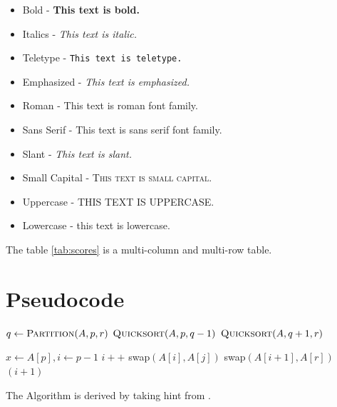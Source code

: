 \documentclass{article}
\begin{document}
\begin{itemize} %
    \item Bold - \textbf{This text is bold.}
    \item Italics - \textit{This text is italic.}
    \item Teletype - \texttt{This text is teletype.}
    \item Emphasized - \emph{This text is emphasized.}
    \item Roman - \textrm{This text is roman font family.}
    \item Sans Serif - \textsf{This text is sans serif font family.}
    \item Slant - \textsl{This text is slant.}
    \item Small Capital - \textsc{This text is small capital.}
    \item Uppercase - \uppercase{This text is uppercase.}
    \item Lowercase - \lowercase{This text is lowercase.}
\end{itemize}

The table \ref{tab:scores} is a multi-column and multi-row table.

\newpage
\pagecolor{white}
\section{Pseudocode} %

\begin{algorithmic}

\State $q \leftarrow \Call{Partition}{A, p, r}$
\State $\Call{Quicksort}{A, p, q-1}$
\State $\Call{Quicksort}{A, q+1, r}$
\EndIf
\EndFunction

\State $x \gets A[p] , i \gets p-1 $
\State $i++$
\State swap$(A[i],A[j])$
\EndIf
\EndFor
\State swap$(A[i+1],A[r])$
\State \Return $(i+1)$
\EndFunction
\end{algorithmic}
The Algorithm is derived by taking hint from \cite{hoare1962quicksort}.

\newpage
\printbibliography %
\end{document}
